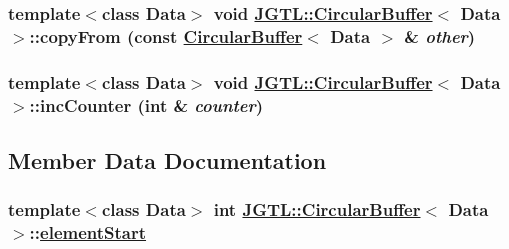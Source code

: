 \hypertarget{class_j_g_t_l_1_1_circular_buffer_5dc9b80c3bcddc61b1c9cbcf88cf79bd}{
\subsubsection[copyFrom]{\setlength{\rightskip}{0pt plus 5cm}template$<$class Data$>$ void \hyperlink{class_j_g_t_l_1_1_circular_buffer}{JGTL::Circular\-Buffer}$<$ Data $>$::copy\-From (const \hyperlink{class_j_g_t_l_1_1_circular_buffer}{Circular\-Buffer}$<$ Data $>$ \& {\em other})}}
\label{class_j_g_t_l_1_1_circular_buffer_5dc9b80c3bcddc61b1c9cbcf88cf79bd}


\hypertarget{class_j_g_t_l_1_1_circular_buffer_3fcdde5d44286f57f909b8e131eabe8b}{
\subsubsection[incCounter]{\setlength{\rightskip}{0pt plus 5cm}template$<$class Data$>$ void \hyperlink{class_j_g_t_l_1_1_circular_buffer}{JGTL::Circular\-Buffer}$<$ Data $>$::inc\-Counter (int \& {\em counter})}}
\label{class_j_g_t_l_1_1_circular_buffer_3fcdde5d44286f57f909b8e131eabe8b}




\subsection{Member Data Documentation}
\hypertarget{class_j_g_t_l_1_1_circular_buffer_1197f15f4384dc23698b8984866acaed}{
\subsubsection[elementStart]{\setlength{\rightskip}{0pt plus 5cm}template$<$class Data$>$ int \hyperlink{class_j_g_t_l_1_1_circular_buffer}{JGTL::Circular\-Buffer}$<$ Data $>$::\hyperlink{class_j_g_t_l_1_1_circular_buffer_1197f15f4384dc23698b8984866acaed}{element\-Start}}}
\label{class_j_g_t_l_1_1_circular_buffer_1197f15f4384dc23698b8984866acaed}


